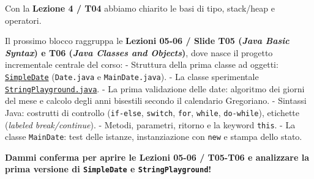 \documentclass[11pt,a4paper]{article}
\newcommand{\passthrough}[1]{#1}
\begin{document}
\begin{studynote} Con la \textbf{Lezione 4 / T04} abbiamo chiarito le basi di
tipo, stack/heap e operatori.

Il prossimo blocco raggruppa le \textbf{Lezioni 05-06 / Slide T05
(\emph{Java Basic Syntax}) e T06 (\emph{Java Classes and Objects})},
dove nasce il progetto incrementale centrale del corso: - Struttura
della prima classe ad oggetti:
\href{file:///home/wally/Documenti/GitHub/Programmazione-II/25-26/Teoria-e-Esercitazioni/Codice-20260902/Lezioni05-06/SimpleDate}{\passthrough{\lstinline!SimpleDate!}}
(\passthrough{\lstinline!Date.java!} e
\passthrough{\lstinline!MainDate.java!}). - La classe sperimentale
\href{file:///home/wally/Documenti/GitHub/Programmazione-II/25-26/Teoria-e-Esercitazioni/Codice-20260902/Lezioni05-06/StringPlayground.java}{\passthrough{\lstinline!StringPlayground.java!}}.
- La prima validazione delle date: algoritmo dei giorni del mese e
calcolo degli anni bisestili secondo il calendario Gregoriano. -
Sintassi Java: costrutti di controllo
(\passthrough{\lstinline!if-else!}, \passthrough{\lstinline!switch!},
\passthrough{\lstinline!for!}, \passthrough{\lstinline!while!},
\passthrough{\lstinline!do-while!}), etichette (\emph{labeled
break/continue}). - Metodi, parametri, ritorno e la keyword
\passthrough{\lstinline!this!}. - La classe
\passthrough{\lstinline!MainDate!}: test delle istanze, instanziazione
con \passthrough{\lstinline!new!} e stampa dello stato.
\end{studynote}

\textbf{Dammi conferma per aprire le Lezioni 05-06 / T05-T06 e
analizzare la prima versione di \passthrough{\lstinline!SimpleDate!} e
\passthrough{\lstinline!StringPlayground!}!}
\end{document}
